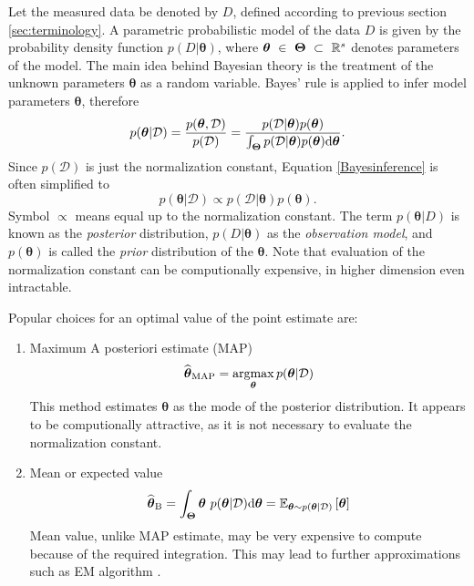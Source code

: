  Let the measured data be denoted by $D$, defined according to previous section \ref{sec:terminology}. A parametric probabilistic model of the data $D$ is given by the probability density function  $p\left(D|\boldsymbol{\theta}\right)$, where $\boldsymbol{\theta}~\in~\boldsymbol{\Theta}~\subset~\mathbb{R}^s$ denotes parameters of the model. The main idea behind Bayesian theory is the treatment of the unknown parameters $\boldsymbol{\theta}$ as a random variable.  Bayes' rule is applied to infer model parameters $\boldsymbol{\theta}$, therefore
 \begin{equation}\label{Bayesinference}
 	p(\boldsymbol{\theta} | \mathcal{D}) = \frac{p(\boldsymbol{\theta}, \mathcal{D})}{p(\mathcal{D})} = \frac{p(\mathcal{D}| \boldsymbol{\theta})p(\boldsymbol{\theta})}{\int_{\boldsymbol{\Theta}}p(\mathcal{D}|\boldsymbol{\theta})p(\boldsymbol{\theta})\mathrm{d}\boldsymbol{\theta}}.
 \end{equation} 
Since $p(\mathcal{D})$ is just the normalization constant, Equation \eqref{Bayesinference} is often simplified to
\begin{equation}
	p(\boldsymbol{\theta} | \mathcal{D}) \propto p(\mathcal{D}| \boldsymbol{\theta})p(\boldsymbol{\theta}).
\end{equation} 
Symbol $\propto$ means equal up to the normalization constant. The term $p(\boldsymbol{\theta} | D)$ is known as the \emph{posterior} distribution, $p(D| \boldsymbol{\theta})$  as the \emph{observation model}, and $p(\boldsymbol{\theta})$ is called the \emph{prior} distribution of the $\boldsymbol{\theta}$. Note that evaluation of the normalization constant can be computionally expensive, in higher dimension even intractable. 

Popular choices for an optimal value of the point estimate are:
\begin{enumerate}
	\item Maximum A posteriori estimate (MAP)
	\begin{equation}
		\widehat{\boldsymbol{\theta}}_{\mathrm{MAP}} = \mathop{\mathrm{argmax}}_{\boldsymbol{\theta}} p(\boldsymbol{\theta} | \mathcal{D})
	\end{equation}
This method estimates $\boldsymbol{\theta}$ as the mode of the posterior distribution. It appears to be computionally attractive, as it is not necessary to evaluate the normalization constant. 
\item Mean or expected value
\begin{equation}
	\widehat{\boldsymbol{\theta}}_{\mathrm{B}} = \int_{\boldsymbol{\Theta}} \boldsymbol{\theta}~ p(\boldsymbol{\theta} | \mathcal{D}) \mathrm{d}\boldsymbol{\theta} = \mathbb{E}_{\boldsymbol{\theta} \sim p(\boldsymbol{\theta} | \mathcal{D}) }\left[\boldsymbol{\theta} \right]
\end{equation}
Mean value, unlike MAP estimate, may be very expensive to compute because of the required integration. This may lead to further approximations such as EM algorithm \cite{EM}.
\end{enumerate}	


